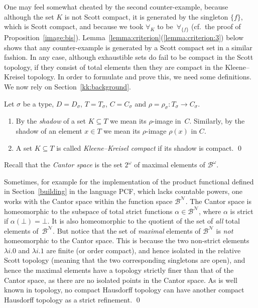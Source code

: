 \documentclass{LMCS}
\newcommand{\Bool}{2}\newcommand{\Sierp}{\mathcal{S}}
\newcommand{\pN}{\mathcal{N}}
\newcommand{\pBool}{\mathcal{B}}
\newcommand{\True}{1}\newcommand{\False}{0}\newcommand{\domain}[1]{{\D_{#1}}}
\newcommand{\total}[1]{{\T_{#1}}}
\newcommand{\quo}[1]{\qq_{#1}}
\newcommand{\qq}{\rho}
\newcommand{\D}{D}
\newcommand{\C}{C}
\newcommand{\T}{T}
\newcommand{\kk}[1]{{\C_{#1}}}
\begin{document}
One may feel somewhat cheated by the second counter-example, because
although the set $K$ is not Scott compact, it is generated by the
singleton $\{f\}$, which is Scott compact, and because we took
$\forall_K$ to be~$\forall_{\{f\}}$ (cf.\ the proof of
Proposition~\ref{image:bis}).
Lemma~\ref{lemma:criterion}(\ref{lemma:criterion:3}) below shows that
any counter-example is generated by a Scott compact set in a similar
fashion.  In any case, although exhaustible sets do fail to be compact
in the Scott topology, if they consist of total elements then they are
compact in the Kleene--Kreisel topology.  In order to formulate and
prove this, we need some definitions. We now rely on
Section~\ref{kk:background}.
\begin{defi} 
  Let $\sigma$ be a type, $\D=\domain{\sigma}$, $\T=\total{\sigma}$,
  $\C=\kk{\sigma}$ and $\qq = \quo{\sigma} \colon \total{\sigma} \to
  \kk{\sigma}$. 
\begin{enumerate}
\item By the \emph{shadow} of a set $K \subseteq \T$ we mean its
  $\qq$-image in~$\C$. 
  Similarly, by the shadow of an element $x \in T$ we mean its
  $\qq$-image $\qq(x)$ in $\C$.

\item A set $K \subseteq T$ is called \emph{Kleene--Kreisel compact}
  if its shadow is compact. \qed
\end{enumerate}
\end{defi}
Recall that the \emph{Cantor space} is the set $\Bool^\omega$ of
maximal elements of $\pBool^\omega$.
\begin{rem}
  Sometimes, for example for the implementation of the product
  functional defined in Section~\ref{building} in the language PCF,
  which lacks countable powers, one works with the Cantor space within
  the function space $\pBool^\pN$. The Cantor space is homeomorphic to
  the subspace of total strict functions $\alpha \in \pBool^\pN$,
  where $\alpha$ is strict if $\alpha(\bot)=\bot$.  It is also
  homeomorphic to the quotient of the set of \emph{all} total elements
  of~$\pBool^\pN$. But notice that the set of \emph{maximal} elements
  of $\pBool^\pN$ is \emph{not} homeomorphic to the Cantor
  space.  This is because the two non-strict elements $\lambda
  i.\False$ and $\lambda i.\True$ are finite (or order compact), and
  hence isolated in the relative Scott topology (meaning that the two
  corresponding singletons are open), and hence the maximal elements
  have a topology strictly finer than that of the Cantor space, as
  there are no isolated points in the Cantor space. As is well known
  in topology, no compact Hausdorff topology can have another compact
  Hausdorff topology as a strict refinement. \qed
\end{rem}
\end{document}
